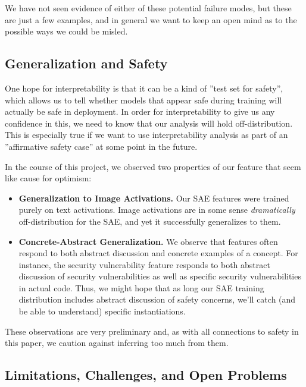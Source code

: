 \documentclass{article}
\let\oldsubsection\subsection
\renewcommand{\subsection}{\FloatBarrier\oldsubsection}
\begin{document}
We have not seen evidence of either of these potential failure modes, but these are just a few examples, and in general we want to keep an open mind as to the possible ways we could be misled.

\subsection{Generalization and Safety}\label{sec:discussion-generalization}

One hope for interpretability is that it can be a kind of ''test set for safety'', which allows us to tell whether models that appear safe during training will actually be safe in deployment. In order for interpretability to give us any confidence in this, we need to know that our analysis will hold off-distribution. This is especially true if we want to use interpretability analysis as part of an ''affirmative safety case'' at some point in the future.

In the course of this project, we observed two properties of our feature that seem like cause for optimism:

\begin{itemize}
    \item \textbf{Generalization to Image Activations.} Our SAE features were trained purely on text activations. Image activations are in some sense \textit{dramatically} off-distribution for the SAE, and yet it successfully generalizes to them.
    \item \textbf{Concrete-Abstract Generalization.} We observe that features often respond to both abstract discussion and concrete examples of a concept. For instance, the security vulnerability feature responds to both abstract discussion of security vulnerabilities as well as specific security vulnerabilities in actual code. Thus, we might hope that as long our SAE training distribution includes abstract discussion of safety concerns, we'll catch (and be able to understand) specific instantiations.
\end{itemize}

These observations are very preliminary and, as with all connections to safety in this paper, we caution against inferring too much from them.

\subsection{Limitations, Challenges, and Open Problems}\label{sec:discussion-limitations}
\end{document}
